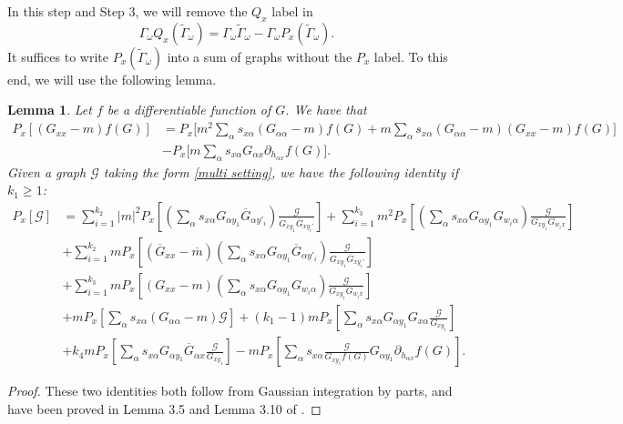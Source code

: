 \documentclass{article}
\newcommand{\1}{\mathds{1}}
\numberwithin{equation}{section}
\newcommand{\al}{\alpha}
\renewcommand{\cal}{\mathcal}
\newcommand{\wt}{\widetilde}
\renewcommand{\geq}{\geqslant}
\renewcommand{\ge}{\geq}
\theoremstyle{plain} %
\newtheorem{lemma}[theorem]{Lemma}
\theoremstyle{remark}
\begin{document}
\medskip   

 In this step and Step 3, we will remove the $Q_x$ label in  
$$\Gamma_\omega Q_x(\wt \Gamma_{\omega})=\Gamma_\omega \wt \Gamma_{\omega} - \Gamma_\omega P_x(\wt \Gamma_{\omega}).$$
It suffices to write $P_x (\wt \Gamma_{\omega})$ into a sum of graphs without the $P_x$ label. To this end, we will use the following lemma. 

\begin{lemma}
Let $f$ be a differentiable function of $G$. %
We have that
\begin{align}
	  P_x \left[(G_{xx}  -  m) f(G)\right] &=  P_x\Big[ m^2 \sum_{\al} s_{x\al} (G_{\al\al}-m)  f(G) + m \sum_{\al} s_{x\al} (G_{\al\al}-m) (G_{xx}-m)f(G)\Big] \nonumber\\
	& -  P_x  \Big[  m \sum_\al s_{x\al} G_{\al x}\partial_{  h_{\al x}} f(G)\Big]. \label{gHw}
\end{align}
Given a graph $\cal G$ taking the form \eqref{multi setting}, we have the following identity if $k_1\ge 1$:
\begin{align} 
	  P_x[\cal G]   &= \sum_{i=1}^{k_2}|m|^2 P_x \left[  \left( \sum_\al s_{x\al }G_{\al y_1} \overline G_{\al y'_i}\right)\frac{\cal G}{G_{x y_1} \overline G_{xy_i'}} \right] + \sum_{i=1}^{k_3} m^2 P_x \left[ \left(\sum_\al s_{x\al }G_{\al y_1} G_{w_i \al} \right)\frac{\cal G}{G_{xy_1}G_{w_i x}}\right] \nonumber \\
	 & + \sum_{i=1}^{k_2}m P_x \left[ \left(\overline G_{xx} -\overline m\right) \left( \sum_\al s_{x\al }G_{\al y_1} \overline G_{\al y'_i}\right)\frac{\cal G}{G_{x y_1} \overline G_{xy_i'}} \right] \nonumber\\
	 &+ \sum_{i=1}^{k_3} m P_x \left[ (G_{xx}-m) \left(\sum_\al s_{x\al }G_{\al y_1} G_{w_i \al} \right)\frac{\cal G}{G_{xy_1}G_{w_i x}}\right] \nonumber \\
	&+  m P_x \left[  \sum_\al s_{x\al }\left(G_{\al \al}-m\right) \cal G\right] +(k_1-1) m P_x \left[  \sum_\al s_{x\al }G_{\al y_1} G_{x \al} \frac{ \cal G}{G_{xy_1}}\right] \nonumber\\
	&+ k_4 m P_x \left[  \sum_\al s_{x\al }G_{\al y_1} \overline G_{\al x} \frac{\cal G}{G_{xy_1}}\right]  - m P_x \left[  \sum_\al s_{x\al }\frac{\cal G}{G_{x y_1}f(G)}G_{\al y_1}\partial_{ h_{\al x}}f (G)\right].\label{gH0} 
\end{align} 
\end{lemma}
\begin{proof}
These two identities both follow from Gaussian integration by parts, and have been proved in Lemma 3.5 and Lemma 3.10 of \cite{PartI_high}.
\end{proof}
\end{document}
